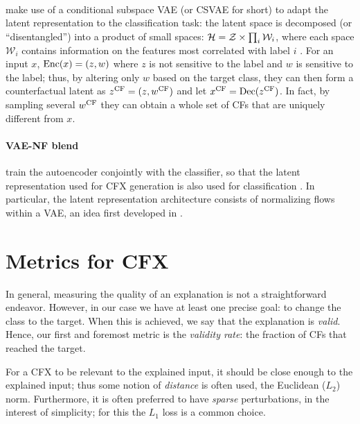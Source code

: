 \documentclass[../main.tex]{subfiles}
\begin{document}
\paragraph{}

\citeauthor{downsCRUDS2020} make use of a conditional subspace VAE (or CSVAE for short) to adapt the latent representation to the classification task:
the latent space is decomposed (or ``disentangled'') into a product of small spaces: $\mathcal{H} = \mathcal{Z} \times \prod_{i} \mathcal{W}_i$, where each space $\mathcal{W}_i$ contains information on the features most correlated with label $i$ \cite{klysLearning2018}.
For an input $x$, $\operatorname{Enc}(x) = (z, w)$ where $z$ is not sensitive to the label and $w$ is sensitive to the label; thus, by altering only $w$ based on the target class, they can then form a counterfactual latent as $z^\text{CF} = (z, w^\text{CF})$ and let $x^\text{CF} = \operatorname{Dec}(z^\text{CF})$.
In fact, by sampling several $w^\text{CF}$ they can obtain a whole set of CFs that are uniquely different from $x$.

\paragraph{VAE-NF blend}

\citeauthor{zhangInterpretable2022} train the autoencoder conjointly with the classifier, so that the latent representation used for CFX generation is also used for classification \cite{zhangInterpretable2022}.
In particular, the latent representation architecture consists of normalizing flows within a VAE, an idea first developed in \cite{rezendeVariational2015}.

\section{Metrics for CFX}

In general, measuring the quality of an explanation is not a straightforward endeavor.
However, in our case we have at least one precise goal: to change the class to the target.
When this is achieved, we say that the explanation is \emph{valid}.
Hence, our first and foremost metric is the \emph{validity rate}: the fraction of CFs that reached the target.

For a CFX to be relevant to the explained input, it should be close enough to the explained input; thus some notion of \emph{distance} is often used, \eg{} the Euclidean ($L_2$) norm.
Furthermore, it is often preferred to have \emph{sparse} perturbations, in the interest of simplicity; for this the $L_1$ loss is a common choice. \citenote{}
\end{document}
